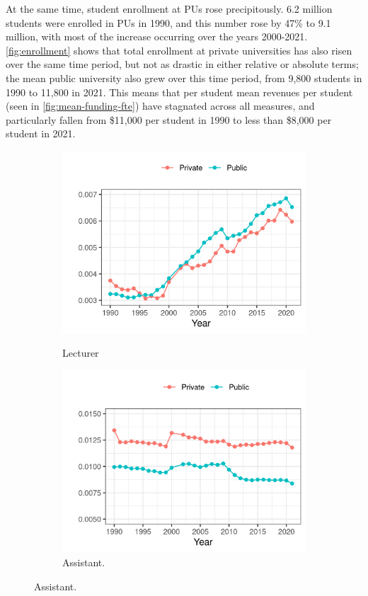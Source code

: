 \documentclass[notitlepage,12pt]{article}
\begin{document}
At the same time, student enrollment at PUs rose precipitously.
6.2 million students were enrolled in PUs in 1990, and this number rose by 47\% to 9.1 million, with most of the increase occurring over the years 2000-2021.
\autoref{fig:enrollment} shows that total enrollment at private universities has also risen over the same time period, but not as drastic in either relative or absolute terms; the mean public university also grew over this time period, from 9,800 students in 1990 to 11,800 in 2021.
This means that per student mean revenues per student (seen in \autoref{fig:mean-funding-fte}) have stagnated across all measures, and particularly fallen from \$11,000 per student in 1990 to less than \$8,000 per student in 2021.
\begin{figure}[!h]
    \centering
    \caption{Total Professor Count per Student, by University Sector, Professor Appointment, and Year.}
    \begin{subfigure}[b]{0.495\textwidth}
        \centering
        \caption{Lecturer}
        \includegraphics[width=\textwidth]{figures/lecturer-fte-perprof.png}
        \label{fig:lecturer-fte-perprof}
    \end{subfigure}
    \begin{subfigure}[b]{0.495\textwidth}
        \centering
        \caption{Assistant.}
        \includegraphics[width=\textwidth]{figures/assistant-fte-perprof.png}

\end{subfigure}
\end{figure}
\end{document}
